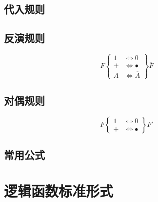 \newpage

\subsection{代入规则}

\subsection{反演规则}

\begin{equation}
    F\left\{
    \begin{aligned}
        1 & \Longleftrightarrow 0           \\
        + & \Longleftrightarrow \bullet     \\
        A & \Longleftrightarrow \overline A
    \end{aligned}
    \right\}\overline F
\end{equation}

\subsection{对偶规则}

\begin{equation}
    F\left\{
    \begin{aligned}
        1 & \Longleftrightarrow 0       \\
        + & \Longleftrightarrow \bullet
    \end{aligned}
    \right\} F'
\end{equation}

\subsection{常用公式}

\newpage

\section{逻辑函数标准形式}

